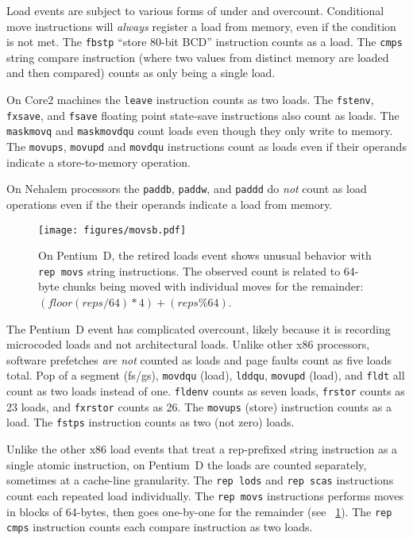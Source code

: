 Load events are subject to various forms of under and overcount.
Conditional move instructions will {\em always} register a 
load from memory, even if the condition is not met.
The {\tt fbstp} ``store 80-bit BCD'' instruction counts as
a load.  The {\tt cmps} string compare instruction (where two values from 
distinct memory are loaded and then compared) counts as only being
a single load.

On Core2 machines the {\tt leave} instruction counts as two loads.
The {\tt fstenv}, {\tt fxsave},  and {\tt fsave} floating point
state-save instructions also count as loads.
The  {\tt maskmovq} and  {\tt maskmovdqu} count loads even though
they only write to memory.  The {\tt movups}, {\tt movupd} and 
{\tt movdqu} instructions count as loads even if their operands
indicate a store-to-memory operation.

On Nehalem processors the {\tt paddb}, {\tt paddw}, and {\tt paddd}
do {\em not} count as load operations even if the their operands
indicate a load from memory.

\begin{figure}[!t]
\centering
\texttt{[image: figures/movsb.pdf]}
\caption{On Pentium~D, the retired loads event shows unusual
       behavior with {\tt rep movs} string instructions.
       The observed count is related to 64-byte chunks being moved
       with individual moves for the remainder:
        $(floor(reps/64)*4)+(reps\%64)$.}
\label{figure:movsb}
\end{figure}

The Pentium~D event has complicated overcount, likely because
it is recording microcoded loads and not architectural loads.
Unlike other x86 processors, software
prefetches {\em are not} counted as loads and page faults 
count as five loads total.
Pop of a segment (fs/gs), {\tt movdqu} (load),
{\tt lddqu}, {\tt movupd} (load), and {\tt fldt} all count
as two loads instead of one. {\tt fldenv} counts as seven loads,
{\tt frstor} counts as 23 loads, and {\tt fxrstor} counts as 26.
The {\tt movups} (store) instruction counts as a load.
The {\tt fstps} instruction  counts as two (not zero) loads.

Unlike the other x86 load events that treat a rep-prefixed string
instruction as a single atomic instruction, on Pentium~D the
loads are counted separately, sometimes at a
cache-line granularity.  The {\tt rep lods} and {\tt rep scas} 
instructions count  each repeated load individually.  
The {\tt rep movs} instructions
performs moves in blocks of 64-bytes, then goes one-by-one
for the remainder (see \figurename~\ref{figure:movsb}).
The {\tt rep cmps} instruction counts each compare instruction
as two loads.

